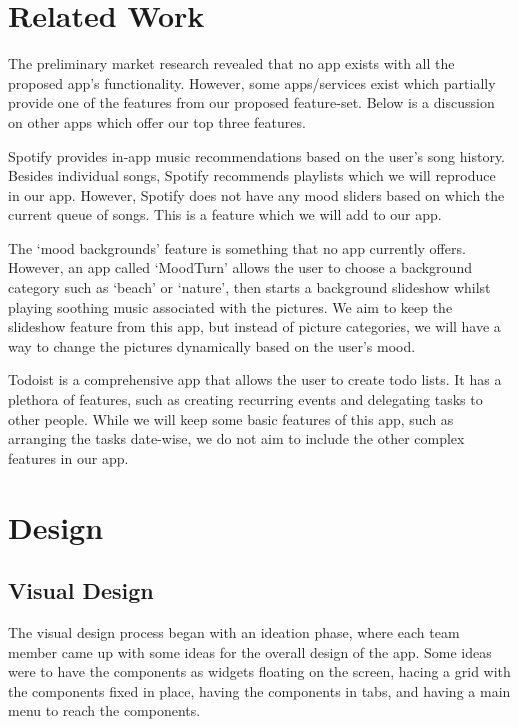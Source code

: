 \documentclass[conference]{IEEEtran}
\begin{document}
\section{Related Work}


The preliminary market research revealed that no app exists with all the proposed app’s functionality. However, some apps/services exist which partially provide one of the features from our proposed feature-set. Below is a discussion on other apps which offer our top three features.

Spotify provides in-app music recommendations based on the user’s song history. Besides individual songs, Spotify recommends playlists which we will reproduce in our app. However, Spotify does not have any mood sliders based on which the current queue of songs. This is a feature which we will add to our app. 

The ‘mood backgrounds’ feature is something that no app currently offers. However, an app called ‘MoodTurn’ allows the user to choose a background category such as ‘beach’ or ‘nature’, then starts a background slideshow whilst playing soothing music associated with the pictures. We aim to keep the slideshow feature from this app, but instead of picture categories, we will have a way to change the pictures dynamically based on the user’s mood. 

Todoist is a comprehensive app that allows the user to create todo lists. It has a plethora of features, such as creating recurring events and delegating tasks to other people. While we will keep some basic features of this app, such as arranging the tasks date-wise, we do not aim to include the other complex features in our app.


\section{Design}

\subsection{Visual Design}
The visual design process began with an ideation phase, where each team member came up with some ideas for the overall design of the app. Some ideas were to have the components as widgets floating on the screen, hacing a grid with the components fixed in place, having the components in tabs, and having a main menu to reach the components. 
\end{document}
